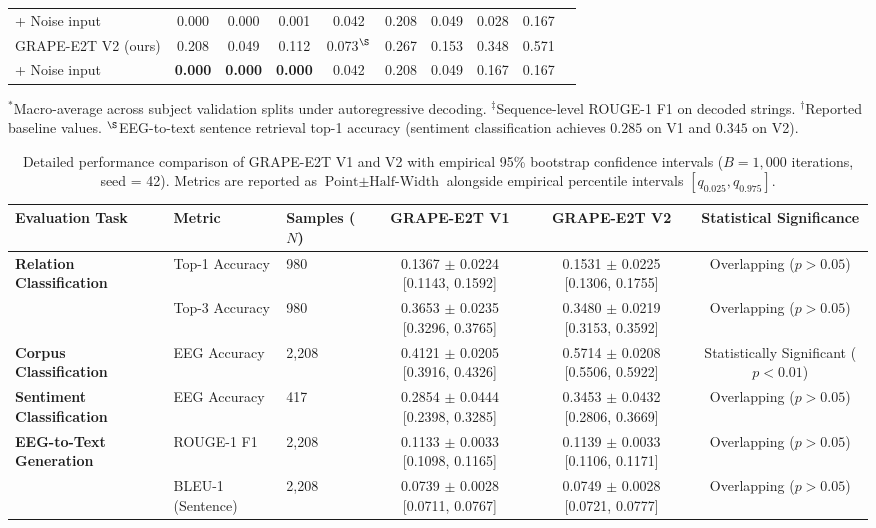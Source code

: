 \begin{table}[!t]
\begin{tabular}{lccccccccc}
\rowcolor{noiserow}
\quad + Noise input                              & 0.000 & 0.000 & 0.001 & 0.042 & 0.208 & 0.049 & 0.028 & 0.167\\
GRAPE-E2T V2 (ours)                              & 0.208 & 0.049 & 0.112 & 0.073$^\S$ & 0.267 & 0.153 & 0.348 & 0.571\\
\rowcolor{noiserow}
\quad + Noise input                              & \textbf{0.000} & \textbf{0.000} & \textbf{0.000} & 0.042 & 0.208 & 0.049 & 0.167 & 0.167\\
\bottomrule
\end{tabular}
\vskip 2pt
\footnotesize{$^\ast$Macro-average across subject validation splits under autoregressive decoding. $^\ddagger$Sequence-level ROUGE-1 F1 on decoded strings. $^\dagger$Reported baseline values. $^\S$EEG-to-text sentence retrieval top-1 accuracy (sentiment classification achieves $0.285$ on V1 and $0.345$ on V2).}
\end{table}


\begin{table}[!t]
\centering
\caption{Detailed performance comparison of GRAPE-E2T V1 and V2 with empirical 95\% bootstrap confidence intervals ($B = 1{,}000$ iterations, seed = 42). Metrics are reported as $\text{Point} \pm \text{Half-Width}$ alongside empirical percentile intervals $[q_{0.025}, q_{0.975}]$.}
\label{tab:bootstrap_ci}
\small
\begin{tabular}{lllccc}
\toprule
\textbf{Evaluation Task} & \textbf{Metric} & \textbf{Samples ($N$)} & \textbf{GRAPE-E2T V1} & \textbf{GRAPE-E2T V2} & \textbf{Statistical Significance} \\
\midrule
\multirow{2}{*}{\textbf{Relation Classification}} 
  & Top-1 Accuracy & 980  & 0.1367 $\pm$ 0.0224 [0.1143, 0.1592] & 0.1531 $\pm$ 0.0225 [0.1306, 0.1755] & Overlapping ($p > 0.05$) \\
  & Top-3 Accuracy & 980  & 0.3653 $\pm$ 0.0235 [0.3296, 0.3765] & 0.3480 $\pm$ 0.0219 [0.3153, 0.3592] & Overlapping ($p > 0.05$) \\
\midrule
\textbf{Corpus Classification} 
  & EEG Accuracy   & 2,208 & 0.4121 $\pm$ 0.0205 [0.3916, 0.4326] & 0.5714 $\pm$ 0.0208 [0.5506, 0.5922] & Statistically Significant ($p < 0.01$) \\
\midrule
\textbf{Sentiment Classification} 
  & EEG Accuracy   & 417  & 0.2854 $\pm$ 0.0444 [0.2398, 0.3285] & 0.3453 $\pm$ 0.0432 [0.2806, 0.3669] & Overlapping ($p > 0.05$) \\
\midrule
\multirow{2}{*}{\textbf{EEG-to-Text Generation}} 
  & ROUGE-1 F1     & 2,208 & 0.1133 $\pm$ 0.0033 [0.1098, 0.1165] & 0.1139 $\pm$ 0.0033 [0.1106, 0.1171] & Overlapping ($p > 0.05$) \\
  & BLEU-1 (Sentence)& 2,208 & 0.0739 $\pm$ 0.0028 [0.0711, 0.0767] & 0.0749 $\pm$ 0.0028 [0.0721, 0.0777] & Overlapping ($p > 0.05$) \\
\bottomrule
\end{tabular}
\end{table}
